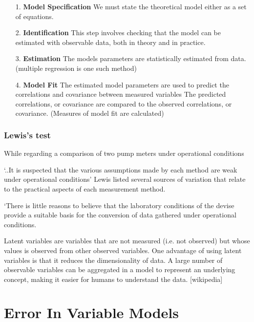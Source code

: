\documentclass[12pt, a4paper]{report}
\theoremstyle{plain}
\theoremstyle{definition}
\theoremstyle{remark}
\begin{document}
\begin{itemize}
\item[1.] \textbf{Model Specification}
We must state the theoretical model either as a set of equations.

\item[2.] \textbf{Identification }
This step involves checking that the model can be estimated with observable data, both in theory and in practice.

\item[3.] \textbf{Estimation}
The models parameters are statistically estimated from data. (multiple regression is one such method)

\item[4.] \textbf{Model Fit}
The estimated model parameters are used to predict the correlations and covariance between measured variables 
The predicted correlations, or covariance are compared to the observed correlations, or covariance. (Measures of model fit are calculated)
\end{itemize}

\subsection{Lewis’s test} 
While regarding a comparison of two pump meters under operational conditions

‘..It is suspected that the various assumptions made by each method are weak under operational conditions’
Lewis listed several sources of variation that relate to the practical aspects of each measurement method.

‘There is little reasons to believe that the laboratory conditions of the devise provide a suitable basis for the conversion of data gathered under operational conditions.


Latent variables are variables that are not measured (i.e. not observed) but whose values is observed from other observed variables. One advantage of using latent variables is that it reduces the dimensionality of data. A large number of observable variables can be aggregated in a model to represent an underlying concept, making it easier for humans to understand the data.	[wikipedia]





\chapter{Error In Variable Models}
\end{document}

